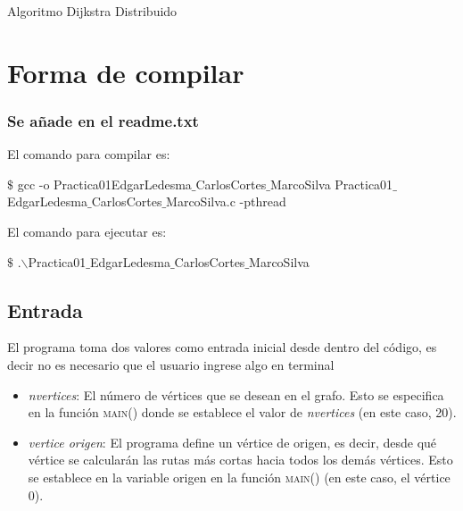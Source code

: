 \documentclass[a4paper,12pt]{article}
\begin{document}





\begin{center}
    {\huge Algoritmo Dijkstra Distribuido}
\end{center}

\section*{Forma de compilar}
\subsubsection*{Se añade en el readme.txt}

El comando para compilar es:
\begin{center}
    $\$$ gcc -o Practica01EdgarLedesma$\_$CarlosCortes$\_$MarcoSilva Practica01$\_$EdgarLedesma$\_$CarlosCortes$\_$MarcoSilva.c -pthread
\end{center}

El comando para ejecutar es:

\begin{center}
    $\$$ .$\backslash$Practica01$\_$EdgarLedesma$\_$CarlosCortes$\_$MarcoSilva
\end{center}


\subsection*{Entrada}
El programa toma dos valores como entrada inicial desde dentro del código, es decir no es necesario que el usuario ingrese algo en terminal

\begin{itemize}
    \item \textit{nvertices}: El número de vértices que se desean en el grafo. Esto se especifica en la función \textsc{main()} donde se establece el valor de \textit{nvertices} (en este caso, 20).

    \item \textit{vertice origen}: El programa define un vértice de origen, es decir, desde qué vértice se calcularán las rutas más cortas hacia todos los demás vértices. Esto se establece en la variable origen en la función \textsc{main()} (en este caso, el vértice 0).
\end{itemize}
\end{document}
